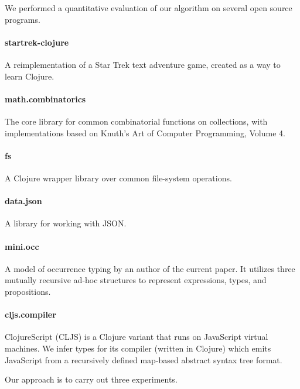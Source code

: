 \label{infer:chap:evaluation}

We performed a quantitative evaluation of our algorithm
on several open source programs.

\paragraph{startrek-clojure}
A reimplementation of a Star Trek text adventure game,
created as a way to learn Clojure.

\paragraph{math.combinatorics}
The core library for common combinatorial functions
on collections,
with implementations based on Knuth's Art of Computer
Programming, Volume 4.

\paragraph{fs}
A Clojure wrapper library over common file-system operations.

\paragraph{data.json}
A library for working with JSON.


\paragraph{mini.occ}
A model of occurrence typing by an author of the
current paper. It utilizes three mutually recursive
ad-hoc structures to represent expressions, types,
and propositions.

\paragraph{cljs.compiler}
ClojureScript (CLJS) is a Clojure variant that runs on JavaScript
virtual machines. We infer types for its compiler (written in Clojure)
which emits JavaScript from
a recursively defined map-based abstract syntax tree format.

Our approach is to carry out three experiments.

